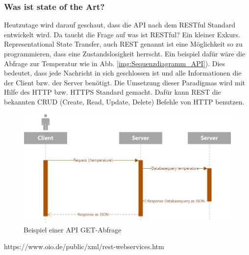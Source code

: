 \subsubsection{Was ist state of the Art?}
Heutzutage wird darauf geschaut, dass die API nach dem RESTful Standard entwickelt wird. Da taucht die Frage auf was ist RESTful? Ein kleiner Exkurs. Representational State Transfer, auch REST genannt ist eine Möglichkeit so zu programmieren, dass eine Zustandslosigkeit herrscht. Ein beispiel dafür wäre die Abfrage zur Temperatur wie in Abb. \ref{img:Sequenzdiagramm_API}).  Dies bedeutet, dass jede Nachricht in sich geschlossen ist und alle Informationen die der Client bzw. der Server benötigt. Die Umsetzung dieser Paradigmas wird mit Hilfe des HTTP bzw. HTTPS Standard gemacht. Dafür kann REST die bekannten CRUD (Create, Read, Update, Delete) Befehle von HTTP benutzen.\\
\begin{figure}[h!]
	\centering
	\includegraphics[width=1\linewidth]{img/Sequenzdiagramm_API}
	\caption{Beispiel einer API GET-Abfrage}
	\label{img:wetterstation}
\end{figure}

https://www.oio.de/public/xml/rest-webservices.htm

